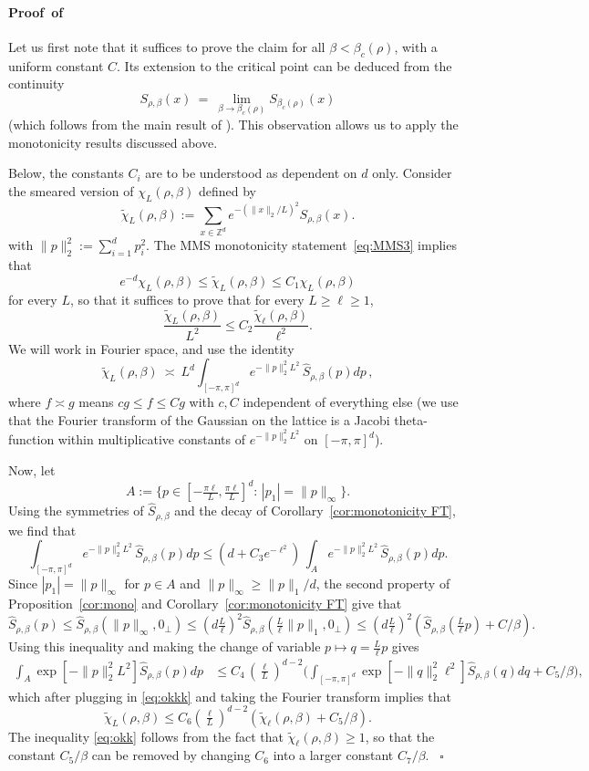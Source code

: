 \documentclass[a4paper,oneside,11pt]{article}
\newcommand{\be}[1]{\begin{equation}\label{#1}}
\newcommand{\ee}{\end{equation}}
\numberwithin{equation}{section}
\numberwithin{equation}{section}
\numberwithin{equation}{section}
\newenvironment{proof}[1][\relax]%
  {\paragraph{Proof\ifx#1\relax\else~of #1\fi}}%
  {~\hfill$\square$\par\bigskip}
\newcommand{\bbZ}{\mathbb{Z}}
\def\be{\begin{equation}}
\def\ee{\end{equation}}
\begin{document}
\begin{proof}   Let us first note that it suffices to prove the claim for all $\beta<\beta_c(\rho)$, with a uniform constant $C$.   Its extension to the critical point can be deduced from the continuity 
\be
S_{\rho,\beta}(x) \ = \ \lim_{\beta\to \beta_c(\rho)} S_{\beta_c(\rho)} (x) 
\ee 
 (which follows from the main result of \cite{AizDumSid15}).    This observation allows us to apply the monotonicity results discussed above. 
  
Below, the constants $C_i$ are to be understood as dependent on $d$ only. Consider the smeared version of $\chi_L(\rho,\beta)$ defined by
\begin{equation}
\widetilde\chi_L(\rho,\beta):=\sum_{x\in \bbZ^d}e^{-(\|x\|_2/L)^2}S_{\rho,\beta}(x).
\end{equation}
with $\|p\|_2^2:=\sum_{i=1}^dp_i^2$.
The MMS monotonicity statement~\eqref{eq:MMS3}  implies that 
\be
e^{-d}\chi_L(\rho,\beta)\le \widetilde\chi_L(\rho,\beta)\le C_1\chi_L(\rho,\beta)
\ee for every $L$, 
so that it suffices to prove that for every $L\ge \ell\ge1$,
\be\label{eq:okk}
\frac{\widetilde\chi_L(\rho,\beta)}{L^2}\le C_2\frac{\widetilde\chi_\ell(\rho,\beta)}{\ell^2}.
\ee
We will work in Fourier space, and use the identity
\be
\widetilde\chi_L(\rho,\beta)~{\asymp}~  
L^d \int_{[-\pi,\pi]^d} e^{-\|p\|_2^2L^2} \, \widehat S_{\rho,\beta}(p) dp \,,
\ee
where $f\asymp g$ means $cg\le f\le Cg$ with $c,C$ independent of everything else (we use that the Fourier transform of the Gaussian on the lattice is a Jacobi theta-function within multiplicative constants of $e^{-\|p\|_2^2L^2}$ on $[-\pi,\pi]^d$).

Now, let 
\be
A:=\{p\in [-\tfrac{\pi\ell}L,\tfrac{\pi\ell}L]^d:\,|p_1|=\|p\|_\infty\}.
\ee Using the symmetries of $\widehat S_{\rho,\beta}$ and the decay of Corollary~\ref{cor:monotonicity FT}, we find that 
\be \label{eq:okkk}
\int_{[-\pi,\pi]^d} e^{-\|p\|_2^2L^2} \,\widehat S_{\rho,\beta}(p) dp \le (d+C_3e^{-\ell^2})\,\int_{A} e^{-\|p\|_2^2L^2} \, \widehat S_{\rho,\beta}(p) dp.
\ee
Since $|p_1|=\|p\|_\infty$ for $p\in A$ and $\|p\|_\infty\ge \|p\|_1/d$, the second property of Proposition~\ref{cor:mono} and Corollary~\ref{cor:monotonicity FT} give that 
\be
\widehat S_{\rho,\beta}(p)\le \widehat S_{\rho,\beta}( \|p\|_\infty, 0_\perp)\le (d\tfrac {L}\ell)^2\widehat S_{\rho,\beta}(\tfrac L\ell \|p\|_1, 0_\perp)\le  (d\tfrac {L}\ell)^2(\widehat S_{\rho,\beta}(\tfrac L\ell p)+C/\beta).
\ee
Using this inequality and making the change of variable $p\mapsto q=\tfrac L\ell p$ gives
\begin{align}
\int_{A} \exp[-\|p\|_2^2L^2] \widehat S_{\rho,\beta}(p) dp&\le C_4\,
(\tfrac \ell L)^{d-2} \Big(\int_{[-\pi,\pi]^d} \exp[-\|q\|_2^2\ell^2]\widehat S_{\rho,\beta}(q) dq+C_5/\beta\Big),
 \end{align}
which after plugging in \eqref{eq:okkk} and taking the Fourier transform implies that 
\be
\widetilde\chi_L(\rho,\beta)\le C_6(\tfrac \ell L)^{d-2}(\widetilde \chi_\ell(\rho,\beta)+C_5/\beta).
\ee
The inequality \eqref{eq:okk} follows from the fact that $\widetilde\chi_\ell(\rho,\beta)\ge 1$, so that the constant $C_5/\beta$ can be removed by changing $C_6$ into a larger constant $C_7/\beta$. 
\end{proof}
\end{document}
